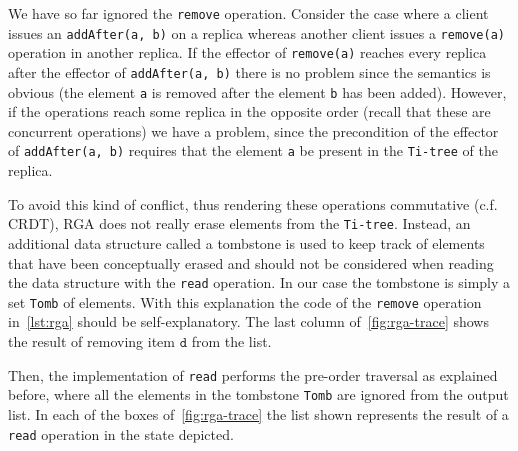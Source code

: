 
We have so far ignored the \lstinline|remove| operation.
%
Consider the case where a client issues an \lstinline|addAfter(a, b)|
on a replica whereas another client issues a \lstinline|remove(a)|
operation in another replica.
%
If the effector of \lstinline|remove(a)| reaches every replica after
the effector of \lstinline|addAfter(a, b)| there is no problem since
the semantics is obvious (the element \lstinline|a| is removed after
the element \lstinline|b| has been added).
%
However, if the operations reach some replica in the opposite order
(recall that these are concurrent operations) we have a problem, since
the precondition of the effector of \lstinline|addAfter(a, b)|
requires that the element \lstinline|a| be present in the
\lstinline|Ti-tree| of the replica.

To avoid this kind of conflict, thus rendering these operations
commutative (c.f. CRDT), RGA does not really erase elements from the
\lstinline|Ti-tree|.
%
Instead, an additional data structure called a tombstone is used to
keep track of elements that have been conceptually erased and should
not be considered when reading the data structure with the
\lstinline|read| operation.
%
In our case the tombstone is simply a set \lstinline|Tomb| of
elements.
%
With this explanation the code of the \lstinline|remove| operation
in~\autoref{lst:rga} should be self-explanatory.
%
The last column of~\autoref{fig:rga-trace} shows the result of
removing item $\mathtt{d}$ from the list.

Then, the implementation of \lstinline|read| performs the pre-order
traversal as explained before, where all the elements in the tombstone
\lstinline|Tomb| are ignored from the output list.
%
In each of the boxes of~\autoref{fig:rga-trace} the list shown
represents the result of a \lstinline|read| operation in the state
depicted.



